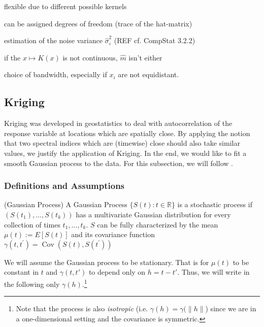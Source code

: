 		\begin{my_pros_cons_table}{
				\item flexible due to different possible kernels
				\item can be assigned degrees of freedom (trace of the hat-matrix)
				\item estimation of the noise variance $\hat \sigma_\varepsilon^2$ (REF cf. CompStat 3.2.2)
			}{
				\item if the $x \mapsto K(x)$ is not continuous, $\hat m $ isn't either
				\item choice of bandwidth, especially if $x_i$ are not equidistant.
			}
		\end{my_pros_cons_table}


	\subsection{Kriging}
		\label{sec:Kriging}

		Kriging was developed in geostatistics to deal with autocorrelation of the response variable at locations which are spatially close. By applying the notion that two spectral indices which are (timewise) close should also take similar values, we justify the application of Kriging. In the end, we would like to fit a smooth Gaussian process to the data. For this subsection, we will follow \cite{diggleGaussianModelsGeostatistical2007}.

		\subsubsection*{Definitions and Assumptions}

			\begin{definition}(Gaussian Process)
				A Gaussian Process $\{S(t) : t\in \mathbb R\} $ is a stochastic process if $(S(t_1),\dots,S(t_k))$ has a multivariate Gaussian distribution for every collection of times ${t_1, \dots , t_k}$.
				$S$ can be fully characterized by the mean $\mu(t):=E[S(t)]$ and its covariance function $\gamma\left(t, t^{\prime}\right)=\operatorname{Cov}\left(S(t), S\left(t^{\prime}\right)\right)$
			\end{definition}

			\begin{assumption}{1}
				\label{ass:kriging_stationary}
				We will assume the Gaussian process to be stationary. That is for $\mu(t)$ to be constant in $t$ and $\gamma(t,t')$ to depend only on $h=t-t'$. Thus, we will write in the following only $\gamma(h)$.\footnote{Note that the process is also \textit{isotropic} (i.e. $\gamma(h)=\gamma(\|h\|$) since we are in a one-dimensional setting and the covariance is symmetric.}
			\end{assumption}

